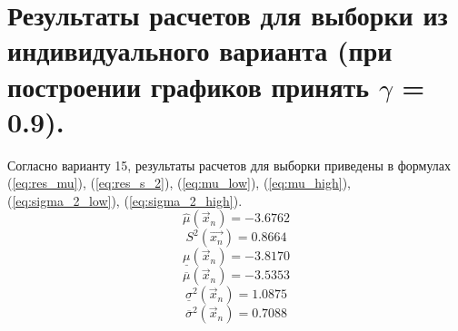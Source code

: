 \section{Результаты расчетов для выборки из индивидуального варианта (при построении графиков принять $\gamma$ = 0.9).}
Согласно варианту 15, результаты расчетов для выборки приведены в формулах (\ref{eq:res_mu}), (\ref{eq:res_s_2}), (\ref{eq:mu_low}), (\ref{eq:mu_high}), (\ref{eq:sigma_2_low}), (\ref{eq:sigma_2_high}).
\begin{equation}
	\label{eq:res_mu}
	\hat\mu(\vec x_n) = -3.6762
\end{equation}
\begin{equation}
	\label{eq:res_s_2}
	S^2(\vec{x_n}) = 0.8664
\end{equation}
\begin{equation}
	\label{eq:mu_low}
	\underline\mu(\vec x_n) = -3.8170
\end{equation}
\begin{equation}
	\label{eq:mu_high}
	\overline\mu(\vec x_n) = -3.5353
\end{equation}
\begin{equation}
	\label{eq:sigma_2_low}
	\underline\sigma^2(\vec x_n) = 1.0875
\end{equation}
\begin{equation}
	\label{eq:sigma_2_high}
	\overline\sigma^2(\vec x_n) = 0.7088
\end{equation}

